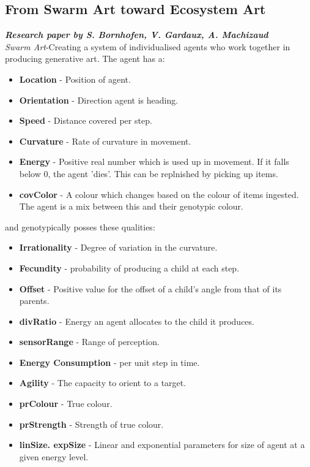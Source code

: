 \documentclass{article}
\begin{document}
\subsection*{From Swarm Art toward Ecosystem Art}
\textbf{\emph{Research paper by S. Bornhofen, V. Gardaux, A. Machizaud}}\\
\emph{Swarm Art}-Creating a system of individualised agents who work together in producing generative art.
The agent has a:
\begin{itemize}
    \item \textbf{Location} - Position of agent.
    \item \textbf{Orientation} - Direction agent is heading.
    \item \textbf{Speed} - Distance covered per step.
    \item \textbf{Curvature} - Rate of curvature in movement.
    \item \textbf{Energy} - Positive real number which is used up in movement. If it falls below 0, the agent 'dies'. This can be replnished by picking up items. 
    \item \textbf{covColor} - A colour which changes based on the colour of items ingested. The agent is a mix between this and their genotypic colour.
\end{itemize}

and genotypically posses these qualities:
\begin{itemize}
    \item \textbf{Irrationality} - Degree of variation in the curvature.
    \item \textbf{Fecundity} - probability of producing a child at each step.
    \item \textbf{Offset} - Positive value for the offset of a child's angle from that of its parents.
    \item \textbf{divRatio} - Energy an agent allocates to the child it produces.
    \item \textbf{sensorRange} - Range of perception.
    \item \textbf{Energy Consumption} - per unit step in time.
    \item \textbf{Agility} - The capacity to orient to a target.
    \item \textbf{prColour} - True colour.
    \item \textbf{prStrength} - Strength of true colour.
    \item \textbf{linSize. expSize} - Linear and exponential parameters for size of agent at a given energy level.      
\end{itemize}
\end{document}
